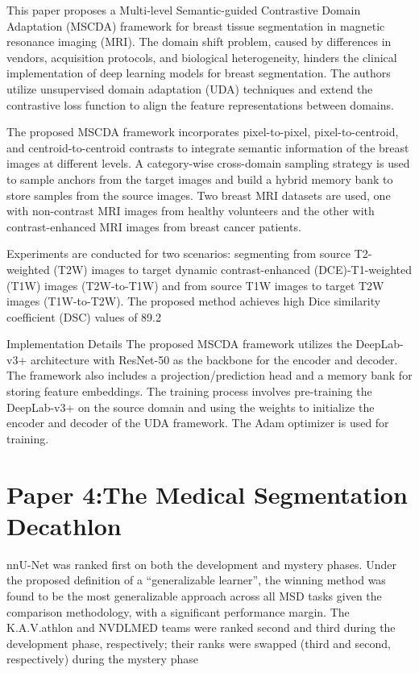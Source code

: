 \documentclass{article}
\begin{document}
This paper proposes a Multi-level Semantic-guided Contrastive Domain Adaptation (MSCDA) framework for breast tissue segmentation in magnetic resonance imaging (MRI). The domain shift problem, caused by differences in vendors, acquisition protocols, and biological heterogeneity, hinders the clinical implementation of deep learning models for breast segmentation. The authors utilize unsupervised domain adaptation (UDA) techniques and extend the contrastive loss function to align the feature representations between domains.

The proposed MSCDA framework incorporates pixel-to-pixel, pixel-to-centroid, and centroid-to-centroid contrasts to integrate semantic information of the breast images at different levels. A category-wise cross-domain sampling strategy is used to sample anchors from the target images and build a hybrid memory bank to store samples from the source images. Two breast MRI datasets are used, one with non-contrast MRI images from healthy volunteers and the other with contrast-enhanced MRI images from breast cancer patients.

Experiments are conducted for two scenarios: segmenting from source T2-weighted (T2W) images to target dynamic contrast-enhanced (DCE)-T1-weighted (T1W) images (T2W-to-T1W) and from source T1W images to target T2W images (T1W-to-T2W). The proposed method achieves high Dice similarity coefficient (DSC) values of 89.2%

Implementation Details
The proposed MSCDA framework utilizes the DeepLab-v3+ architecture with ResNet-50 as the backbone for the encoder and decoder. The framework also includes a projection/prediction head and a memory bank for storing feature embeddings. The training process involves pre-training the DeepLab-v3+ on the source domain and using the weights to initialize the encoder and decoder of the UDA framework. The Adam optimizer is used for training.
\section{Paper 4:The Medical Segmentation Decathlon }
nnU-Net
was ranked first on both the development and mystery phases.
Under the proposed definition of a “generalizable learner”, the
winning method was found to be the most generalizable approach
across all MSD tasks given the comparison methodology, with a
significant performance margin. The K.A.V.athlon and
NVDLMED teams were ranked second and third during the
development phase, respectively; their ranks were swapped (third
and second, respectively) during the mystery phase
\end{document}
